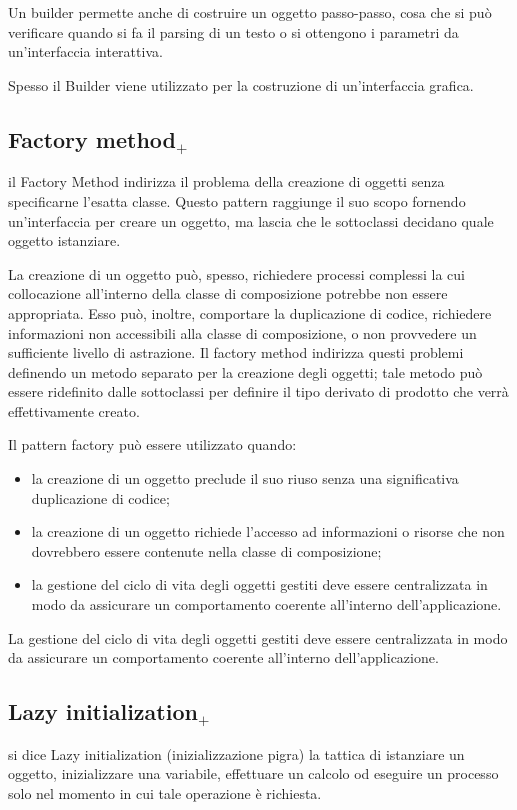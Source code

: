 Un builder permette anche di costruire un oggetto passo-passo, cosa che si può verificare quando si fa il parsing di un testo o si ottengono i parametri da un'interfaccia interattiva.

Spesso il Builder viene utilizzato per la costruzione di un'interfaccia grafica.

\subsection{Factory method$_+$}
il Factory Method indirizza il problema della creazione di oggetti senza specificarne l'esatta classe. Questo pattern raggiunge il suo scopo fornendo un'interfaccia per creare un oggetto, ma lascia che le sottoclassi decidano quale oggetto istanziare.

La creazione di un oggetto può, spesso, richiedere processi complessi la cui collocazione all'interno della classe di composizione potrebbe non essere appropriata. Esso può, inoltre, comportare la duplicazione di codice, richiedere informazioni non accessibili alla classe di composizione, o non provvedere un sufficiente livello di astrazione.
 Il factory method indirizza questi problemi definendo un metodo separato per la creazione degli oggetti; tale metodo può essere ridefinito dalle sottoclassi per definire il tipo derivato di prodotto che verrà effettivamente creato.

Il pattern factory può essere utilizzato quando:
\begin{itemize}
	\item la creazione di un oggetto preclude il suo riuso senza una significativa duplicazione di codice;
	\item la creazione di un oggetto richiede l'accesso ad informazioni o risorse che non dovrebbero essere contenute nella classe di composizione;
	\item la gestione del ciclo di vita degli oggetti gestiti deve essere centralizzata in modo da assicurare un comportamento coerente all'interno dell'applicazione.
\end{itemize}
La gestione del ciclo di vita degli oggetti gestiti deve essere centralizzata in modo da assicurare un comportamento coerente all'interno dell'applicazione.

\subsection{Lazy initialization$_+$}
si dice Lazy initialization (inizializzazione pigra) la tattica di istanziare un oggetto, inizializzare una variabile, effettuare un calcolo od eseguire un processo solo nel momento in cui tale operazione è richiesta.

